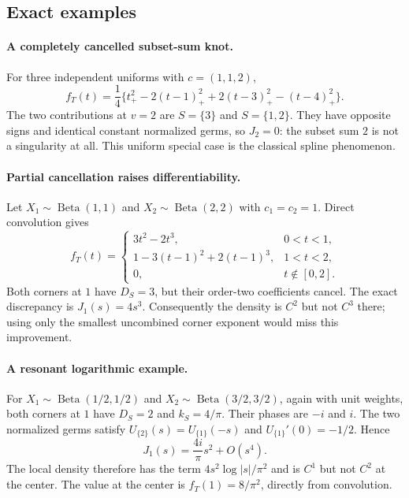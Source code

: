 \documentclass[11pt,a4paper]{article}
\theoremstyle{definition}
\theoremstyle{remark}
\numberwithin{equation}{section}
\begin{document}
\subsection{Exact examples}

\paragraph{A completely cancelled subset-sum knot.}
For three independent uniforms with $c=(1,1,2)$,
\[
 f_T(t)=\frac14\{t_+^2-2(t-1)_+^2
                     +2(t-3)_+^2-(t-4)_+^2\}.
\]
The two contributions at $v=2$ are $S=\{3\}$ and $S=\{1,2\}$.
They have opposite signs and identical constant normalized germs,
so $J_2=0$: the subset sum $2$ is not a singularity at all.
This uniform special case is the classical spline phenomenon.

\paragraph{Partial cancellation raises differentiability.}
Let $X_1\sim\operatorname{Beta}(1,1)$ and
$X_2\sim\operatorname{Beta}(2,2)$ with $c_1=c_2=1$. Direct convolution
gives
\[
 f_T(t)=\begin{cases}3t^2-2t^3,&0<t<1,\\
              1-3(t-1)^2+2(t-1)^3,&1<t<2,\\0,&t\notin[0,2].\end{cases}
\]
Both corners at $1$ have $D_S=3$, but their order-two coefficients
cancel. The exact discrepancy is $J_1(s)=4s^3$.
Consequently the density is $C^2$ but not $C^3$ there; using only
the smallest uncombined corner exponent would miss this improvement.

\paragraph{A resonant logarithmic example.}
For $X_1\sim\operatorname{Beta}(1/2,1/2)$ and
$X_2\sim\operatorname{Beta}(3/2,3/2)$, again with unit weights,
both corners at $1$ have $D_S=2$ and $k_S=4/\pi$.
Their phases are $-i$ and $i$. The two normalized germs satisfy
$U_{\{2\}}(s)=U_{\{1\}}(-s)$ and
$U_{\{1\}}'(0)=-1/2$. Hence
\[
 J_1(s)=\frac{4i}{\pi}s^2+O(s^4).
\]
The local density therefore has the term
$4s^2\log|s|/\pi^2$ and is $C^1$ but not $C^2$ at the center.
The value at the center is $f_T(1)=8/\pi^2$, directly from convolution.
\end{document}
